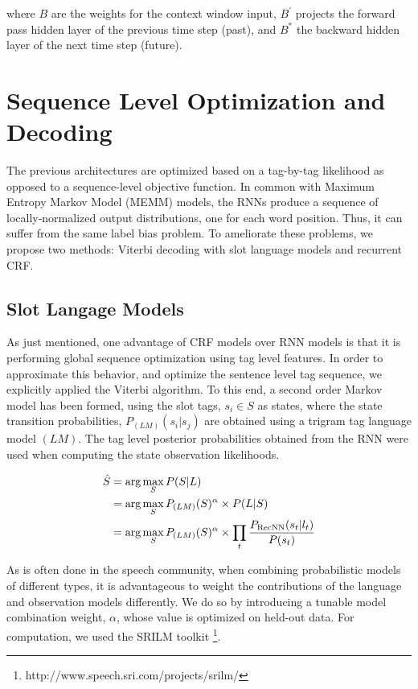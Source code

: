 where $B$ are the weights for the context window input, $B^{'}$ projects the
forward pass hidden layer of the previous time step (past), and $B^{*}$ the
backward hidden layer of the next time step (future).


\section{Sequence Level Optimization and Decoding} \label{sec:slod}

The previous architectures are optimized based on a tag-by-tag likelihood as
opposed to a sequence-level objective function. In common with Maximum Entropy
Markov Model (MEMM) \citep{rnn28} models, the RNNs produce a sequence of
locally-normalized output distributions, one for each word position. Thus, it
can suffer from the same label bias \citep{rnn6} problem. To ameliorate these problems,
we propose two methods: Viterbi decoding with slot language models and
recurrent CRF.

\subsection{Slot Langage Models}

As just mentioned, one advantage of CRF models over RNN models is that it is
performing global sequence optimization using tag level features. In order to
approximate this behavior, and optimize the sentence level tag sequence, we
explicitly applied the Viterbi \citep{rnn40} algorithm. To this end, a second order
Markov model has been formed, using the slot tags, $s_{i}\in S$ as states, where the
state transition probabilities, $P_{(LM)}  (s_{i}\vert s_{j} )$ are obtained using a trigram
tag language model $(LM)$. The tag level posterior probabilities obtained from
the RNN were used when computing the state observation likelihoods.

\begin{align*}
\centering
\hat{S} & =  \textrm{arg}\max_{S} P(S\vert L) \\
& =  \textrm{arg}\max_{S} P_{(LM)}(S)^{\alpha}\times P(L \vert S)\\
& =  \textrm{arg}\max_{S} P_{(LM)}(S)^{\alpha}\times \prod_{t} \frac{P_{\textrm{RecNN}}(s_{t}\vert l_{t})}{P(s_{t})}
\end{align*}

As is often done in the speech community, when combining probabilistic models
of different types, it is advantageous to weight the contributions of the
language and observation models differently. We do so by introducing a tunable
model combination weight, $\alpha$, whose value is optimized on held-out data. For
computation, we used the SRILM toolkit
\footnote{http://www.speech.sri.com/projects/srilm/}.


